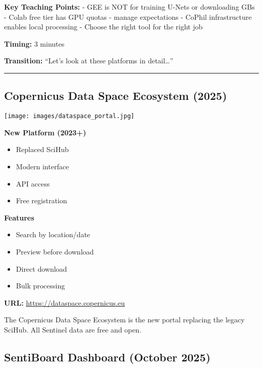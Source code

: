 \documentclass[
  letterpaper,
  DIV=11,
  numbers=noendperiod]{scrartcl}
\providecommand{\tightlist}{%
  \setlength{\itemsep}{0pt}\setlength{\parskip}{0pt}}
\begin{document}
\textbf{Key Teaching Points:} - GEE is NOT for training U-Nets or
downloading GBs - Colab free tier has GPU quotas - manage expectations -
CoPhil infrastructure enables local processing - Choose the right tool
for the right job

\textbf{Timing:} 3 minutes

\textbf{Transition:} ``Let's look at these platforms in detail\ldots{}''

\begin{center}\rule{0.5\linewidth}{0.5pt}\end{center}

\subsection{Copernicus Data Space Ecosystem
(2025)}\label{copernicus-data-space-ecosystem-2025}

\begin{center}
\texttt{[image: images/dataspace\_portal.jpg]}
\end{center}

\textbf{New Platform (2023+)}

\begin{itemize}
\tightlist
\item
  Replaced SciHub
\item
  Modern interface
\item
  API access
\item
  Free registration
\end{itemize}

\textbf{Features}

\begin{itemize}
\tightlist
\item
  Search by location/date
\item
  Preview before download
\item
  Direct download
\item
  Bulk processing
\end{itemize}

\textbf{URL:} \url{https://dataspace.copernicus.eu}

The Copernicus Data Space Ecosystem is the new portal replacing the
legacy SciHub. All Sentinel data are free and open.

\subsection{SentiBoard Dashboard (October
2025)}\label{sentiboard-dashboard-october-2025}
\end{document}
